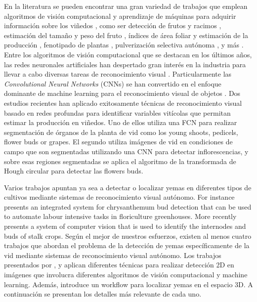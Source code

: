 \documentclass[a4paper,authoryear,review]{elsarticle}
\begin{document}
En la literatura se pueden encontrar una gran variedad de trabajos que emplean algoritmos de visión computacional y aprendizaje de máquinas para adquirir información sobre los viñedos \citep{seng2018computer}, como ser detección de frutos y racimos \citep{nuske2011yield}, estimación del tamaño y peso del fruto \citep{tardaguila2012automatic}, índices de área foliar y estimación de la producción \citep{diago2012grapevine}, fenotipado de plantas \citep{herzog2014initial}, pulverización selectiva autónoma \citep{berenstein2010grape}, y más \citep{tardaguila2012applications, whalley2013applications}. Entre los algoritmos de visión computacional que se destacan en los últimos años, las redes neuronales artificiales han despertado gran interés en la industria para llevar a cabo diversas tareas de reconocimiento visual \citep{hirano2006industry, kahng2017cti, tilgner2019multi}. Particularmente las \emph{Convolutional Neural Networks} (CNNs) se han convertido en el enfoque dominante de machine learning para el reconocimiento visual de objetos \citep{ning2017inception}. Dos estudios recientes han aplicado exitosamente técnicas de reconocimiento visual basado en redes profundas para identificar variables vitícolas que permitan estimar la producción en viñedos. Uno de ellos \citet{grimm2019adaptable} utiliza una FCN para realizar segmentación de órganos de la planta de vid como los young shoots, pedicels, flower buds or grapes. El segundo \citet{rudolph2018efficient} utiliza imágenes de vid en condiciones de campo que son segmentadas utilizando una CNN para detectar inflorescencias, y sobre esas regiones segmentadas se aplica el algoritmo de la transformada de Hough circular para detectar las flowers buds.

Varios trabajos apuntan ya sea a detectar o localizar yemas en diferentes tipos de cultivos mediante sistemas de reconocimiento visual autónomo. For instance \citet{tarry2014integrated} presents an integrated system for chrysanthemum bud detection that can be used to automate labour intensive tasks in floriculture greenhouses. More recently \citet{zhao2018research} presents a system  of  computer  vision  that is used  to  identify  the  internodes and  buds  of  stalk  crops. Según el mejor de nuestros esfuerzos, existen al menos cuatro trabajos que abordan el problema de la detección de yemas específicamente de la vid mediante sistemas de reconocimiento visual autónomo. Los trabajos presentados por \citet{xu2014detection}, \citet{herzog2014objective} y \citet{perez2017image} aplican diferentes técnicas para realizar detección 2D en imágenes que involucra diferentes algoritmos de visión computacional y machine learning. Además, \citet{diaz2018grapevine} introduce un workflow para localizar yemas en el espacio 3D. A continuación se presentan los detalles más relevante de cada uno.
\end{document}

